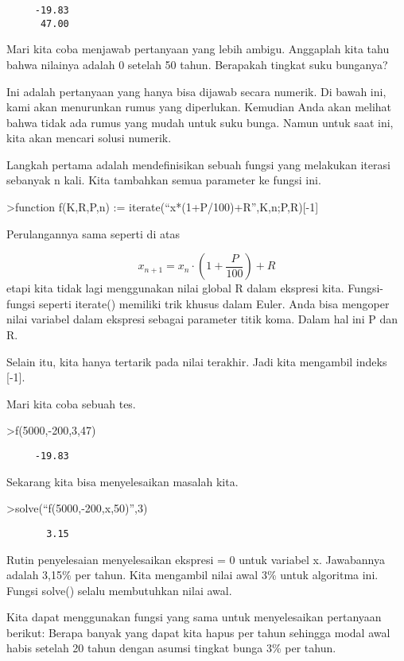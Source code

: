 \documentclass[
]{book}
\begin{document}
\begin{verbatim}
     -19.83 
      47.00 
\end{verbatim}

Mari kita coba menjawab pertanyaan yang lebih ambigu. Anggaplah kita tahu bahwa nilainya adalah 0 setelah 50 tahun. Berapakah tingkat suku bunganya?

Ini adalah pertanyaan yang hanya bisa dijawab secara numerik. Di bawah ini, kami akan menurunkan rumus yang diperlukan. Kemudian Anda akan melihat bahwa tidak ada rumus yang mudah untuk suku bunga. Namun untuk saat ini, kita akan mencari solusi numerik.

Langkah pertama adalah mendefinisikan sebuah fungsi yang melakukan iterasi sebanyak n kali. Kita tambahkan semua parameter ke fungsi ini.

\textgreater function f(K,R,P,n) := iterate(``x*(1+P/100)+R'',K,n;P,R){[}-1{]}

Perulangannya sama seperti di atas

\[x_{n+1} = x_n \cdot \left(1+ \frac{P}{100}\right) + R\]etapi kita tidak lagi menggunakan nilai global R dalam ekspresi kita. Fungsi-fungsi seperti iterate() memiliki trik khusus dalam Euler. Anda bisa mengoper nilai variabel dalam ekspresi sebagai parameter titik koma. Dalam hal ini P dan R.

Selain itu, kita hanya tertarik pada nilai terakhir. Jadi kita mengambil indeks {[}-1{]}.

Mari kita coba sebuah tes.

\textgreater f(5000,-200,3,47)

\begin{verbatim}
     -19.83 
\end{verbatim}

Sekarang kita bisa menyelesaikan masalah kita.

\textgreater solve(``f(5000,-200,x,50)'',3)

\begin{verbatim}
       3.15 
\end{verbatim}

Rutin penyelesaian menyelesaikan ekspresi = 0 untuk variabel x. Jawabannya adalah 3,15\% per tahun. Kita mengambil nilai awal 3\% untuk algoritma ini. Fungsi solve() selalu membutuhkan nilai awal.

Kita dapat menggunakan fungsi yang sama untuk menyelesaikan pertanyaan berikut: Berapa banyak yang dapat kita hapus per tahun sehingga modal awal habis setelah 20 tahun dengan asumsi tingkat bunga 3\% per tahun.
\end{document}
